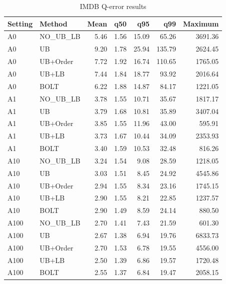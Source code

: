 \begin{table}[H]
\centering
\small
\setlength{\tabcolsep}{5pt}
\caption{IMDB Q-error results}
\label{tab:A_accuracy_IMDB}
\begin{tabular}{@{}llrrrrr@{}}
\toprule
Setting & Method & Mean & q50 & q95 & q99 & Maximum \\
\midrule
A0 & NO\_UB_LB & 5.46 & 1.56 & 15.09 & 65.26 & 3691.36 \\
A0 & UB & 9.20 & 1.78 & 25.94 & 135.79 & 2624.45 \\
A0 & UB+Order & 7.72 & 1.92 & 16.74 & 110.65 & 1765.05 \\
A0 & UB+LB & 7.44 & 1.84 & 18.77 & 93.92 & 2016.64 \\
A0 & BOLT & 6.22 & 1.88 & 14.87 & 84.17 & 1221.05 \\
A1 & NO\_UB_LB & 3.78 & 1.55 & 10.71 & 35.67 & 1817.17 \\
A1 & UB & 3.79 & 1.68 & 10.81 & 35.89 & 3407.04 \\
A1 & UB+Order & 3.85 & 1.55 & 11.96 & 43.00 & 595.91 \\
A1 & UB+LB & 3.73 & 1.67 & 10.44 & 34.09 & 2353.93 \\
A1 & BOLT & 3.40 & 1.59 & 10.53 & 32.48 & 816.26 \\
A10 & NO\_UB_LB & 3.24 & 1.54 & 9.08 & 28.59 & 1218.05 \\
A10 & UB & 3.03 & 1.51 & 8.45 & 24.92 & 4545.86 \\
A10 & UB+Order & 2.94 & 1.55 & 8.34 & 23.16 & 1745.15 \\
A10 & UB+LB & 2.90 & 1.55 & 8.21 & 22.85 & 1237.57 \\
A10 & BOLT & 2.90 & 1.49 & 8.59 & 24.14 & 880.50 \\
A100 & NO\_UB_LB & 2.70 & 1.41 & 7.43 & 21.59 & 601.30 \\
A100 & UB & 2.67 & 1.38 & 6.94 & 19.76 & 6833.73 \\
A100 & UB+Order & 2.70 & 1.53 & 6.78 & 19.55 & 4556.00 \\
A100 & UB+LB & 2.50 & 1.39 & 6.86 & 19.57 & 1720.48 \\
A100 & BOLT & 2.55 & 1.37 & 6.84 & 19.47 & 2058.15 \\
\bottomrule
\end{tabular}
\end{table}
